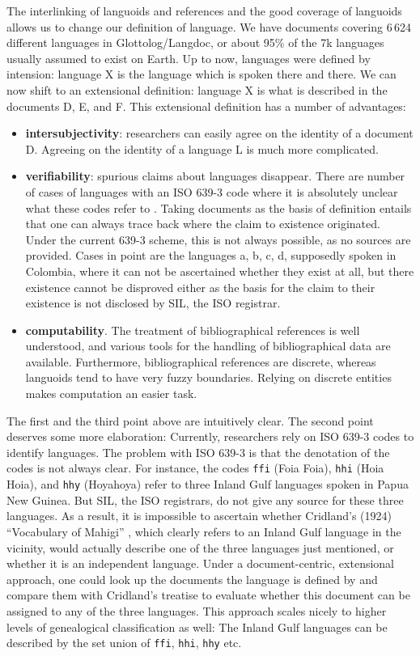 \documentclass[10pt, a4paper]{article}
\begin{document}
The interlinking of languoids and references and the good coverage of languoids allows us to change our definition of language. We have documents covering  6\,624 different languages in Glottolog/Langdoc, or about 95\% of the 7k languages usually assumed to exist on Earth. Up to now, languages were defined by intension: language X is the language which is spoken there and there. We can now shift to an extensional definition: language X is what is described in the documents D, E, and F. This extensional definition has a number of advantages:

\begin{itemize}
 \item \textbf{intersubjectivity}: researchers can easily agree on the identity of a document D. Agreeing on the identity of a language L is much more complicated.
 \item \textbf{verifiability}: spurious claims about languages disappear. There are  number of cases of languages with an ISO 639-3 code where it is absolutely unclear what these codes refer to \cite{NordhoffEtAl2011iswc}. Taking documents as the basis of definition entails that one can always trace back where the claim to existence originated. Under the current 639-3 scheme, this is not always possible, as no sources are provided. Cases in point are the languages a, b, c, d, supposedly spoken in Colombia, where it can not be ascertained whether they exist at all, but there existence cannot be disproved either as the basis for the claim to their existence is not disclosed by SIL, the ISO registrar.
 \item \textbf{computability}. The treatment of bibliographical references is well understood, and various tools for the handling of bibliographical data are available. Furthermore, bibliographical references are discrete, whereas languoids tend to have very fuzzy boundaries. Relying on discrete entities makes computation an easier task.
\end{itemize}

The first and the third point above are intuitively clear. The second point deserves some more elaboration: Currently, researchers rely on ISO 639-3 codes to identify languages.
The problem with ISO 639-3 is that the denotation of the codes is not always
clear. For instance, the codes \texttt{ffi} (Foia Foia), \texttt{hhi} (Hoia Hoia), and \texttt{hhy} (Hoyahoya)
refer to three Inland Gulf languages spoken in Papua New Guinea. But
SIL, the ISO registrars, do not give any source for these three languages. As a
result, it is impossible to ascertain whether  Cridland's (1924) ``Vocabulary of
Mahigi'' \cite{Cridland1924}, which clearly refers to an Inland Gulf language in the vicinity, would
actually describe one of the three languages just mentioned, or whether it is an
independent language. Under a document-centric, extensional approach, one could look up the documents the language is defined by and compare them with Cridland's treatise to evaluate whether this document can be assigned to any of the three languages.
This approach scales nicely to higher levels of genealogical classification as well: The Inland Gulf languages can be described by the set union of \texttt{ffi}, \texttt{hhi}, \texttt{hhy} etc.
\end{document}

